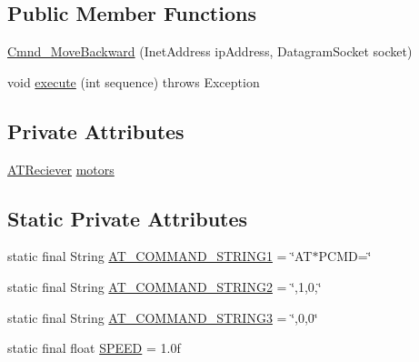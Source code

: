 \subsection*{Public Member Functions}
\begin{DoxyCompactItemize}
\item 
\hyperlink{class_drone_1_1_drone_commands_1_1_cmnd___move_backward_a2f724fe4d2a9b8985ee0d0ba04d7672b}{Cmnd\+\_\+\+Move\+Backward} (Inet\+Address ip\+Address, Datagram\+Socket socket)
\item 
void \hyperlink{class_drone_1_1_drone_commands_1_1_cmnd___move_backward_a4768346289e58b1bf2de05356af6c78a}{execute} (int sequence)  throws Exception  	
\end{DoxyCompactItemize}
\subsection*{Private Attributes}
\begin{DoxyCompactItemize}
\item 
\hyperlink{class_drone_1_1_hardware_1_1_a_t_reciever}{A\+T\+Reciever} \hyperlink{class_drone_1_1_drone_commands_1_1_cmnd___move_backward_a5cf26b01ac06582a0f4266dc43636472}{motors}
\end{DoxyCompactItemize}
\subsection*{Static Private Attributes}
\begin{DoxyCompactItemize}
\item 
static final String \hyperlink{class_drone_1_1_drone_commands_1_1_cmnd___move_backward_a14d409a098bbdf04f397770a2bfb3e8f}{A\+T\+\_\+\+C\+O\+M\+M\+A\+N\+D\+\_\+\+S\+T\+R\+I\+N\+G1} = \char`\"{}A\+T$\ast$P\+C\+M\+D=\char`\"{}
\item 
static final String \hyperlink{class_drone_1_1_drone_commands_1_1_cmnd___move_backward_a47f8174531dc5dd1d91dc8a2d42ada5d}{A\+T\+\_\+\+C\+O\+M\+M\+A\+N\+D\+\_\+\+S\+T\+R\+I\+N\+G2} = \char`\"{},1,0,\char`\"{}
\item 
static final String \hyperlink{class_drone_1_1_drone_commands_1_1_cmnd___move_backward_a7d2de3cf241b958ba196187bbb4d76cb}{A\+T\+\_\+\+C\+O\+M\+M\+A\+N\+D\+\_\+\+S\+T\+R\+I\+N\+G3} = \char`\"{},0,0\char`\"{}
\item 
static final float \hyperlink{class_drone_1_1_drone_commands_1_1_cmnd___move_backward_ac466e98dfc44cc00aedefcf3a1695c78}{S\+P\+E\+E\+D} = 1.\+0f
\end{DoxyCompactItemize}



